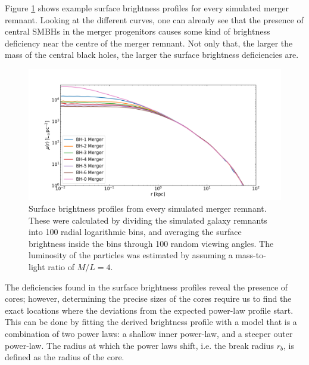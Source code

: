 \documentclass[english, oneside]{HYgradu}
\begin{document}
Figure \ref{figure:surface_brightness} shows example surface brightness profiles for every simulated merger remnant. Looking at the different curves, one can already see that the presence of central SMBHs in the merger progenitors causes some kind of brightness deficiency near the centre of the merger remnant. Not only that, the larger the mass of the central black holes, the larger the surface brightness deficiencies are.

\begin{figure}[h]
	\centering
	\includegraphics[width=\textwidth]{SurfaceBrightnessProfiles.png}
	\caption{Surface brightness profiles from every simulated merger remnant. These were calculated by dividing the simulated galaxy remnants into 100 radial logarithmic bins, and averaging the surface brightness inside the bins through 100 random viewing angles. The luminosity of the particles was estimated by assuming a mass-to-light ratio of $M/L = 4$.}
	\label{figure:surface_brightness}
\end{figure}

The deficiencies found in the surface brightness profiles reveal the presence of cores; however, determining the precise sizes of the cores require us to find the exact locations where the deviations from the expected power-law profile start. This can be done by fitting the derived brightness profile with a model that is a combination of two power laws: a shallow inner power-law, and a steeper outer power-law. The radius at which the power laws shift, i.e. the break radius $r_b$, is defined as the radius of the core. 
\end{document}
